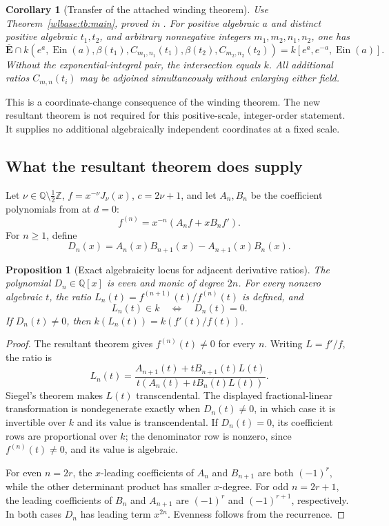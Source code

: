 \documentclass[11pt,a4paper]{article}
\newtheorem{proposition}[theorem]{Proposition}
\newtheorem{corollary}[theorem]{Corollary}
\theoremstyle{definition}\newtheorem{definition}[theorem]{Definition}
\theoremstyle{remark}\newtheorem{remark}[theorem]{Remark}
\newcommand{\Ein}{\operatorname{Ein}}
\begin{document}
\begin{corollary}[Transfer of the attached winding theorem]
Use Theorem~\ref{wlbase:tb:main}, proved in \cite{WL}. For positive algebraic
$a$ and distinct positive algebraic $t_1,t_2$, and arbitrary
nonnegative integers $m_1,m_2,n_1,n_2$, one has
\[
 \overline{\mathbf E}\cap
 k(e^a,\Ein(a),\beta(t_1),C_{m_1,n_1}(t_1),
                    \beta(t_2),C_{m_2,n_2}(t_2))
 =k[e^a,e^{-a},\Ein(a)].
\]
Without the exponential-integral pair, the intersection equals $k$.
All additional ratios $C_{m,n}(t_i)$ may be adjoined simultaneously
without enlarging either field.
\end{corollary}

This is a coordinate-change consequence of the winding theorem. The
new resultant theorem is not required for this positive-scale,
integer-order statement. It supplies no additional algebraically
independent coordinates at a fixed scale.

\subsection{What the resultant theorem does supply}

Let $\nu\in\mathbb Q\setminus\frac12\mathbb Z$,
$f=x^{-\nu}J_\nu(x)$, $c=2\nu+1$, and let $A_n,B_n$ be the
coefficient polynomials from \cite{BR} at $d=0$:
\[
 f^{(n)}=x^{-n}(A_nf+xB_nf').
\]
For $n\ge1$, define
\[
 D_n(x)=A_n(x)B_{n+1}(x)-A_{n+1}(x)B_n(x).
\]

\begin{proposition}[Exact algebraicity locus for adjacent derivative ratios]
The polynomial $D_n\in\mathbb Q[x]$ is even and monic of degree $2n$.
For every nonzero algebraic $t$, the ratio
$L_n(t)=f^{(n+1)}(t)/f^{(n)}(t)$ is defined, and
\[
 L_n(t)\in k\quad\Longleftrightarrow\quad D_n(t)=0.
\]
If $D_n(t)\ne0$, then
$k(L_n(t))=k(f'(t)/f(t))$.
\end{proposition}

\begin{proof}
The resultant theorem gives $f^{(n)}(t)\ne0$ for every $n$.
Writing $L=f'/f$, the ratio is
\[
 L_n(t)=\frac{A_{n+1}(t)+tB_{n+1}(t)L(t)}
 {t(A_n(t)+tB_n(t)L(t))}.
\]
Siegel's theorem makes $L(t)$ transcendental. The displayed
fractional-linear transformation is nondegenerate exactly when
$D_n(t)\ne0$, in which case it is invertible over $k$ and its value
is transcendental. If $D_n(t)=0$, its coefficient rows are
proportional over $k$; the denominator row is nonzero, since
$f^{(n)}(t)\ne0$, and its value is algebraic.

For even $n=2r$, the $x$-leading coefficients of $A_n$ and $B_{n+1}$
are both $(-1)^r$, while the other determinant product has smaller
$x$-degree. For odd $n=2r+1$, the leading coefficients of $B_n$ and
$A_{n+1}$ are $(-1)^r$ and $(-1)^{r+1}$, respectively. In both cases
$D_n$ has leading term $x^{2n}$. Evenness follows from the recurrence.
\end{proof}
\end{document}

